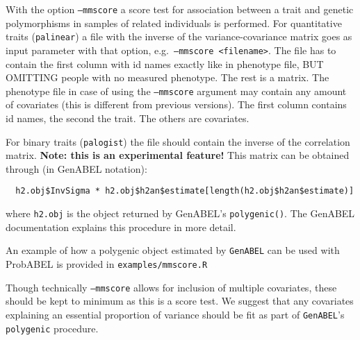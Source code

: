 \documentclass[12pt,a4paper]{article}
\newcommand{\PA}{\texttt{ProbABEL}}
\newcommand{\GA}{\texttt{GenABEL}}
\begin{document}
With the option \texttt{--mmscore} a score test for association
between a trait and genetic polymorphisms in samples of related
individuals is performed. For quantitative traits (\texttt{palinear})
a file with the inverse of the variance-covariance matrix goes as input
parameter with that option, e.g.~\texttt{--mmscore <filename>}. The
file has to contain the first column with id names exactly like in
phenotype file, BUT OMITTING people with no measured phenotype. The
rest is a matrix. The phenotype file in case of using the
\texttt{--mmscore} argument may contain any amount of covariates (this
is different from previous versions). The first column contains id
names, the second the trait. The others are covariates.

For binary traits (\texttt{palogist}) the file should contain the
inverse of the correlation matrix. \textbf{Note: this is an
  experimental feature!} This matrix can be obtained through (in
GenABEL notation):
\begin{verbatim}
  h2.obj$InvSigma * h2.obj$h2an$estimate[length(h2.obj$h2an$estimate)]
\end{verbatim}
where \texttt{h2.obj} is the object returned by GenABEL's
\texttt{polygenic()}. The GenABEL documentation explains this
procedure in more detail.

An example of how a polygenic object estimated by \GA{} can be used
with ProbABEL is provided in \texttt{examples/mmscore.R}

Though technically \texttt{--mmscore} allows for inclusion of multiple
covariates, these should be kept to minimum as this is a score test. We
suggest that any covariates explaining an essential proportion of
variance should be fit as part of \GA{}'s
\texttt{polygenic} procedure.

\end{document}
